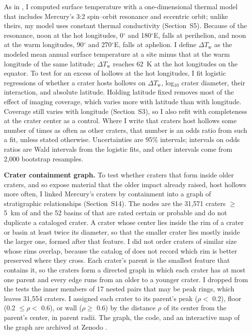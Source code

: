 \documentclass[article,review]{planetary}
\begin{document}
As in \textcite{vasavada1999}, I computed surface temperature with a one-dimensional thermal model that includes Mercury's 3:2 spin--orbit resonance and eccentric orbit; unlike theirs, my model uses constant thermal conductivity (Section~S5). Because of the resonance, noon at the hot longitudes, 0$^\circ$ and 180$^\circ$E, falls at perihelion, and noon at the warm longitudes, 90$^\circ$ and 270$^\circ$E, falls at aphelion. I define $\Delta T_\mathrm{w}$ as the modeled mean annual surface temperature at a site minus that at the warm longitude of the same latitude; $\Delta T_\mathrm{w}$ reaches 62~K at the hot longitudes on the equator. To test for an excess of hollows at the hot longitudes, I fit logistic regressions of whether a crater hosts hollows on $\Delta T_\mathrm{w}$, log$_{10}$ crater diameter, their interaction, and absolute latitude. Holding latitude fixed removes most of the effect of imaging coverage, which varies more with latitude than with longitude. Coverage still varies with longitude (Section~S3), so I also refit with completeness at the crater center as a control. Where I write that craters host hollows some number of times as often as other craters, that number is an odds ratio from such a fit, unless stated otherwise. Uncertainties are 95\% intervals; intervals on odds ratios are Wald intervals from the logistic fits, and other intervals come from 2,000 bootstrap resamples.

\textbf{Crater containment graph.} To test whether craters that form inside older craters, and so expose material that the older impact already raised, host hollows more often, I linked Mercury's craters by containment into a graph of stratigraphic relationships (Section~S14). The nodes are the 31,571 craters $\geq$ 5~km of \textcite{herrick2018} and the 52 basins of \textcite{orgel2020} that are rated certain or probable and do not duplicate a cataloged crater. A crater whose center lies inside the rim of a crater or basin at least twice its diameter, so that the smaller crater lies mostly inside the larger one, formed after that feature. I did not order craters of similar size whose rims overlap, because the catalog of \textcite{herrick2018} does not record which rim is better preserved where they cross. Each crater's parent is the smallest feature that contains it, so the craters form a directed graph in which each crater has at most one parent and every edge runs from an older to a younger crater. I dropped from the tests the inner members of 17 nested pairs that may be peak rings, which leaves 31,554 craters. I assigned each crater to its parent's peak ($\rho <$ 0.2), floor (0.2 $\leq \rho <$ 0.6), or wall ($\rho \geq$ 0.6) by the distance $\rho$ of its center from the parent's center, in parent radii. The graph, the code, and an interactive map of the graph are archived at Zenodo \parencite{zenodo_cratergraph}.
\end{document}
